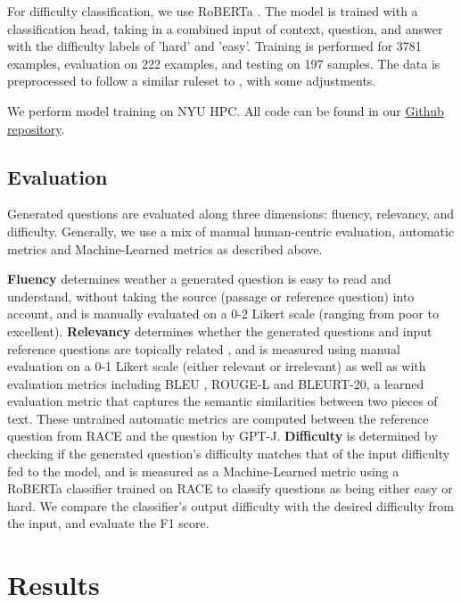 \documentclass[11pt]{article}
\begin{document}
For difficulty classification, we use RoBERTa \citep{roberta:12}. The model is trained with a classification head, taking in a combined input of context, question, and answer with the difficulty labels of 'hard' and 'easy'. Training is performed for 3781 examples, evaluation on 222 examples, and testing on 197 samples. The data is preprocessed to follow a similar ruleset to \citet{Difficulty:3}, with some adjustments.

We perform model training on NYU HPC. All code can be found in our \href{https://github.com/rbolline/Neural-Question-Generation-with-GPT-J}{Github repository}. 


\subsection{Evaluation}

Generated questions are evaluated along three dimensions: fluency, relevancy, and difficulty. Generally, we use a mix of manual human-centric evaluation, automatic metrics and Machine-Learned metrics as described above.

\textbf{Fluency} determines weather a generated question is easy to read and understand, without taking the source (passage or reference question) into account, and is manually evaluated on a 0-2 Likert scale (ranging from poor to excellent). \textbf{Relevancy} determines whether the generated questions and input reference questions are topically related \citep{relevancy:14}, and is measured using manual evaluation on a 0-1 Likert scale (either relevant or irrelevant) as well as with evaluation metrics including BLEU \citep{BLEU:6}, ROUGE-L \citep{rouge:5} and BLEURT-20, \citep{bleurt:7} a learned evaluation metric that captures the semantic similarities between two pieces of text. These untrained automatic metrics are computed between the reference question from RACE and the question by GPT-J. \textbf{Difficulty} is determined by checking if the generated question’s difficulty matches that of the input difficulty fed to the model, and is measured as a Machine-Learned metric using a RoBERTa \citep{roberta:12} classifier trained on RACE to classify questions as being either easy or hard. We compare the classifier's output difficulty with the desired difficulty from the input, and evaluate the F1 score.  

\section{Results}
\end{document}
